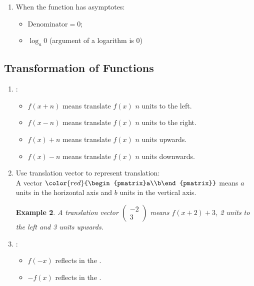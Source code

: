 \documentclass[12pt, a4paper]{article}
\newtheorem{example}{Example}[subsection]
\begin{document}
\begin{enumerate}
\begin{itemize}
\begin{example}
\begin{figure}[H]
            \end{figure}
        \end{example}
    \end{itemize}
    \item When the function has asymptotes: 
    \begin{itemize}
        \item Denominator$=0$;
        \item $\log_a{0}$ (argument of a logarithm is 0)
    \end{itemize}
\end{enumerate}

\subsection{Transformation of Functions}
\begin{enumerate}
    \item \textbf{\color{red}{Translation}}: 
    \begin{itemize}
        \item $f(x+n)$ means translate $f(x)$ $n$ units to the left. 
        \item $f(x-n)$ means translate $f(x)$ $n$ units to the right. 
        \item $f(x)+n$ means translate $f(x)$ $n$ units upwards.
        \item $f(x)-n$ means translate $f(x)$ $n$ units downwards.
    \end{itemize}
    \item Use translation vector to represent translation: \\
    A vector ${\color{red}{\begin{pmatrix}a\\b\end{pmatrix}}}$ means $a$ units in the horizontal axis and $b$ units in the vertical axis. 
    \begin{example}
        A translation vector $\begin{pmatrix}-2\\3\end{pmatrix}$ means $f(x+2)+3$, 2 units to the left and 3 units upwards. 
    \end{example}
    \item \textbf{\color{red}{Reflections}}: 
    \begin{itemize}
        \item $f(-x)$ reflects in the {\color{red}{$y$-axis}}. 
        \item $-f(x)$ reflects in the {\color{red}{$x$-axis}}. 

\end{itemize}
\end{enumerate}
\end{document}
